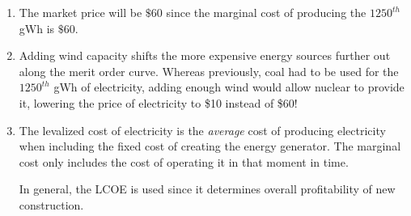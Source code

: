 \documentclass[11pt]{article}
\begin{document}
\begin{enumerate}
{\begin{enumerate}
      \item The market price will be $\$60$ since the marginal cost of producing the $1250^{th}$ gWh is $\$60$.
      
      \item Adding wind capacity shifts the more expensive energy sources further out along the merit order curve. Whereas previously, coal had to be used for the $1250^{th}$ gWh of electricity, adding enough wind would allow nuclear to provide it, lowering the price of electricity to \$10 instead of \$60!
      
      \item The levalized cost of electricity is the \emph{average} cost of producing electricity when including the fixed cost of creating the energy generator. The marginal cost only includes the cost of operating it in that moment in time. 
      
      In general, the LCOE is used since it determines overall profitability of new construction.
    \end{enumerate}
  }
\end{enumerate}
\end{document}
